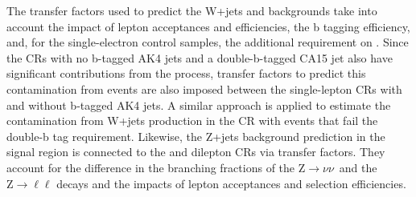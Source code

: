The transfer factors used to predict the W+jets and \ttbar backgrounds take into account the impact of lepton acceptances and efficiencies, the b tagging efficiency, and, for the single-electron control samples, the additional requirement on \MET.
Since the CRs with no b-tagged AK4 jets and a double-b-tagged CA15 jet also have significant contributions from the \ttbar process,  transfer factors to predict this contamination from \ttbar events are also imposed between the single-lepton CRs with and without b-tagged AK4 jets.
A similar approach is applied to estimate the contamination from W+jets production in the \ttbar CR with events that fail the double-b tag requirement. 
Likewise, the Z+jets background prediction in the signal region is connected to the and dilepton CRs via transfer factors.
They account for the difference in the branching fractions of the $\mathrm{Z}\rightarrow \nu\nu$~and the $\mathrm{Z}\rightarrow \ell\ell$ decays and the impacts of lepton acceptances and selection efficiencies.
